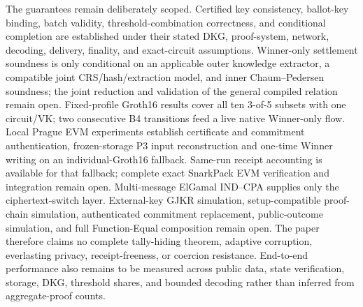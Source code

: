 \documentclass[pdflatex,sn-mathphys-num]{sn-jnl}%
\theoremstyle{thmstyleone}%
\theoremstyle{thmstyletwo}%
\theoremstyle{thmstylethree}%
\begin{document}
The guarantees remain deliberately scoped.  Certified key consistency,
ballot-key binding, batch validity, threshold-combination correctness, and conditional
completion are established under their stated DKG, proof-system, network,
decoding, delivery, finality, and exact-circuit assumptions.  Winner-only
settlement soundness is only conditional on an applicable outer knowledge
extractor, a compatible joint CRS/hash/extraction model, and inner
Chaum--Pedersen soundness; the joint reduction and validation of the general
compiled relation remain open. Fixed-profile Groth16 results cover all ten
3-of-5 subsets with one circuit/VK; two consecutive B4 transitions feed a live
native Winner-only flow. Local Prague EVM experiments establish certificate
and commitment authentication, frozen-storage P3 input reconstruction and
one-time Winner writing on an individual-Groth16 fallback. Same-run receipt
accounting is available for that fallback; complete exact SnarkPack EVM
verification and integration remain open.
Multi-message
ElGamal IND--CPA supplies only the ciphertext-switch layer.  External-key GJKR
simulation, setup-compatible proof-chain simulation, authenticated commitment
replacement, public-outcome simulation, and full Function-Equal composition
remain open.  The paper therefore claims no complete tally-hiding theorem,
adaptive corruption, everlasting privacy, receipt-freeness, or coercion
resistance.  End-to-end performance also remains to
be measured across public data, state verification, storage, DKG, threshold
shares, and bounded decoding rather than inferred from aggregate-proof counts.
\end{document}
